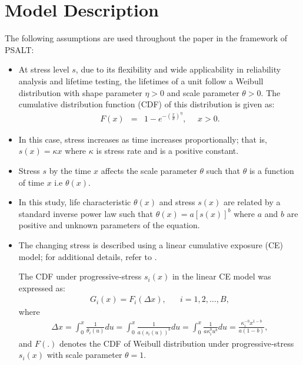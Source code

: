 \documentclass[twoside]{article}
\begin{document}
\section{Model Description}


The following assumptions are used throughout the paper in the framework of PSALT:
\begin{itemize}
\item[1.]
At stress level $s$, due to its flexibility and wide applicability in reliability analysis and lifetime testing, the lifetimes of a unit follow a Weibull distribution with shape parameter $\eta>0$ and scale parameter $\theta>0$. The cumulative distribution function (CDF) of this distribution is given as:
\begin{eqnarray*}
\label{f1}
F(x) & = & 1-e^{-(\frac{x}{\theta})^{\eta}}, \,\,\,\,\,\,\,\, x>0. 
\end{eqnarray*}
\item[2.]
In this case, stress increases as time increases proportionally; that is, $s(x)=\kappa x$ where $\kappa$ is stress rate and is a positive constant.

\item[3.]
Stress $s$ by the time $x$ affects the scale parameter $\theta$ such that $\theta$ is a function of time $x$ i.e $\theta(x)$.

\item[4.]
In this study, life characteristic $\theta(x)$ and stress $s(x)$ are related by a standard inverse power law such that $\theta(x)=a[s(x)]^b$ where $a$ and $b$ are positive and unknown parameters of the equation.

\item[5.]
The changing stress is described using a linear cumulative exposure (CE) model; for additional details, refer to                    \cite{Nelson1982}.

The CDF under progressive‐stress $s_i(x)$ in the linear CE model was expressed as:
\begin{eqnarray*}
G_i(x)=F_i(\Delta x), \,\,\,\,\,\,\,\,\,\, i=1,2,\dots,B,
\end{eqnarray*}
where 
\begin{eqnarray*}
\Delta x = \int_{0}^{x} \frac{1}{\theta_i(u)} du = \int_{0}^{x} \frac{1}{a(s_i(u))^b} du = \int_{0}^{x} \frac{1}{a \kappa_i^b u^b} du = \frac{\kappa_i^{-b} x^{1-b}}{a(1-b)},
\end{eqnarray*}
and $F (.)$ denotes the CDF of Weibull distribution under progressive‐stress $s_i(x)$ with scale parameter $\theta=1$. 


\end{itemize}
\end{document}
